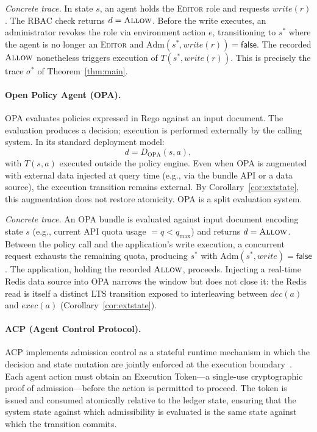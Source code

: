 \documentclass[11pt]{article}
\theoremstyle{plain}
\theoremstyle{definition}
\theoremstyle{remark}
\newcommand{\Allow}{\textsc{Allow}}
\newcommand{\Adm}{\mathrm{Adm}}
\begin{document}
\emph{Concrete trace.}  In state $s$, an agent holds the \textsc{Editor} role
and requests $\mathit{write}(r)$.  The RBAC check returns $d = \Allow$.
Before the write executes, an administrator revokes the role via environment
action $e$, transitioning to $s^*$ where the agent is no longer an
\textsc{Editor} and $\Adm(s^*, \mathit{write}(r)) = \mathsf{false}$.  The
recorded $\Allow$ nonetheless triggers execution of $T(s^*, \mathit{write}(r))$.
This is precisely the trace $\sigma^*$ of Theorem~\ref{thm:main}.

\paragraph{Open Policy Agent (OPA).}
OPA evaluates policies expressed in Rego against an input document.  The
evaluation produces a decision; execution is performed externally by the
calling system.  In its standard deployment model:
\[
  d = D_{\mathrm{OPA}}(s, a),
\]
with $T(s, a)$ executed outside the policy engine.  Even when OPA is
augmented with external data injected at query time (e.g., via the bundle API
or a data source), the execution transition remains external.  By
Corollary~\ref{cor:extstate}, this augmentation does not restore atomicity.
OPA is a split evaluation system.

\emph{Concrete trace.}  An OPA bundle is evaluated against input document
encoding state $s$ (e.g., current API quota usage $= q < q_{\max}$) and
returns $d = \Allow$.  Between the policy call and the application's write
execution, a concurrent request exhausts the remaining quota, producing $s^*$
with $\Adm(s^*, \mathit{write}) = \mathsf{false}$.  The application, holding
the recorded $\Allow$, proceeds.  Injecting a real-time Redis data source into
OPA narrows the window but does not close it: the Redis read is itself a
distinct LTS transition exposed to interleaving between $\mathit{dec}(a)$
and $\mathit{exec}(a)$ (Corollary~\ref{cor:extstate}).

\paragraph{ACP (Agent Control Protocol).}
ACP implements admission control as a stateful runtime mechanism in which
the decision and state mutation are jointly enforced at the execution
boundary~\cite{acp26}.  Each agent action must obtain an Execution Token---a
single-use cryptographic proof of admission---before the action is permitted
to proceed.  The token is issued and consumed atomically relative to the
ledger state, ensuring that the system state against which admissibility is
evaluated is the same state against which the transition commits.
\end{document}
